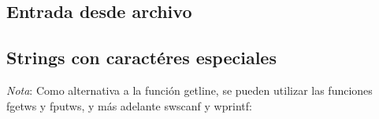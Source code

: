 \documentclass[10pt,letterpaper]{article}
\begin{document}
\subsection{Entrada desde archivo}

\subsection{Strings con caractéres especiales}

\emph{Nota}: Como alternativa a la función getline, se pueden utilizar las funciones fgetws y fputws, y más adelante swscanf y wprintf:
\end{document}
